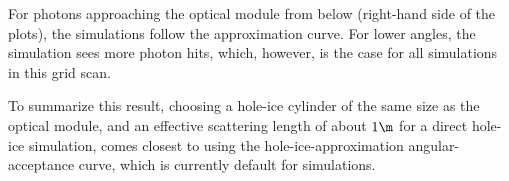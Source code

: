 For photons approaching the optical module from below (right-hand side of the plots), the simulations follow the approximation curve. For lower angles, the simulation sees more photon hits, which, however, is the case for all simulations in this grid scan.

To summarize this result, choosing a hole-ice cylinder of the same size as the optical module, and an effective scattering length of about $1\m$ for a direct hole-ice simulation, comes closest to using the hole-ice-approximation angular-acceptance curve, which is currently default for \clsim simulations.

